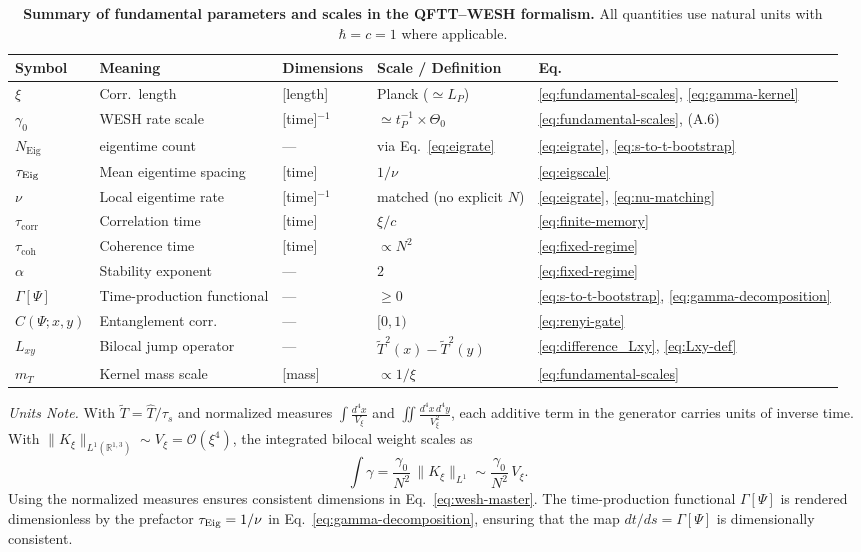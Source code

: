 \documentclass[12pt,a4paper]{article}
\newcommand{\Ttil}{\tilde T}      %
\newcommand{\Vxi}{V_\xi}          %
\newcommand{\intx}{\int \frac{d^4x}{\Vxi}}
\newcommand{\intxy}{\iint \frac{d^4x\,d^4y}{\Vxi^2}}
\numberwithin{equation}{section}
\begin{document}
\begin{table}[H]
\centering
\caption{\textbf{Summary of fundamental parameters and scales in the QFTT--WESH formalism.} All quantities use natural units with $\hbar=c=1$ where applicable.}
\label{tab:parameters}
\footnotesize
\setlength{\tabcolsep}{4pt}
\renewcommand{\arraystretch}{1.10}
\begin{tabularx}{\linewidth}{l Y Y Y l}
\toprule
\textbf{Symbol} & \textbf{Meaning} & \textbf{Dimensions} & \textbf{Scale / Definition} & \textbf{Eq.} \\
\midrule
$\xi$ &  Corr.\ length & [length] & Planck ($\simeq L_P$) & \eqref{eq:fundamental-scales}, \eqref{eq:gamma-kernel} \\
$\gamma_0$  & WESH rate scale & [time]$^{-1}$ &
$\simeq t_P^{-1}\!\times\!\Theta_0$ &
\eqref{eq:fundamental-scales}, (A.6) \\
$N_{\mathrm{Eig}}$ & eigentime count & --- &
via Eq.~\eqref{eq:eigrate} &
\eqref{eq:eigrate}, \eqref{eq:s-to-t-bootstrap} \\
$\tau_{\rm Eig}$  & Mean eigentime spacing & [time] & $1/\nu$ &
\eqref{eq:eigscale} \\
$\nu$ & Local eigentime rate & [time]$^{-1}$ &
matched (no explicit $N$) &
\eqref{eq:eigrate}, \eqref{eq:nu-matching} \\
$\tau_{\mathrm{corr}}$ & Correlation time & [time] & $\xi/c$ &
\eqref{eq:finite-memory} \\
$\tau_{\mathrm{coh}}$ & Coherence time & [time] & $\propto N^{2}$ &
\eqref{eq:fixed-regime} \\
$\alpha$ & Stability exponent & --- & $2$ &
\eqref{eq:fixed-regime} \\
$\Gamma[\Psi]$ & Time-production functional & --- &
$\ge 0$ & \eqref{eq:s-to-t-bootstrap}, \eqref{eq:gamma-decomposition} \\
$C(\Psi;x,y)$ & Entanglement corr.\ & --- & $[0,1)$ &
\eqref{eq:renyi-gate} \\
$L_{xy}$ & Bilocal jump operator & --- & $\tilde{T}^2(x)-\tilde{T}^2(y)$ &
\eqref{eq:difference_Lxy}, \eqref{eq:Lxy-def} \\
$m_T$ & Kernel mass scale & [mass] & $\propto 1/\xi$ &
\eqref{eq:fundamental-scales} \\
\bottomrule
\end{tabularx}
\vspace{0.3cm}
\parbox{\linewidth}{\footnotesize 
\noindent\emph{Units Note.} With $\Ttil=\hat T/\tau_s$ and normalized measures
$\intx$ and $\intxy$, each additive term in the generator carries units
of inverse time. With $\|K_\xi\|_{L^1(\mathbb{R}^{1,3})}\sim V_\xi=\mathcal O(\xi^4)$,
the integrated bilocal weight scales as 
\[
\int\!\gamma=\frac{\gamma_0}{N^2}\,\|K_\xi\|_{L^1}\sim\frac{\gamma_0}{N^2}\,V_\xi.
\] Using the
normalized measures ensures consistent dimensions in Eq.~\eqref{eq:wesh-master}. 
The time-production functional $\Gamma[\Psi]$ is rendered dimensionless by the prefactor
$\tau_{\rm Eig}=1/\nu$ in Eq.~\eqref{eq:gamma-decomposition}, ensuring that
the map $dt/ds=\Gamma[\Psi]$ is dimensionally consistent.
}
\end{table}
\end{document}
